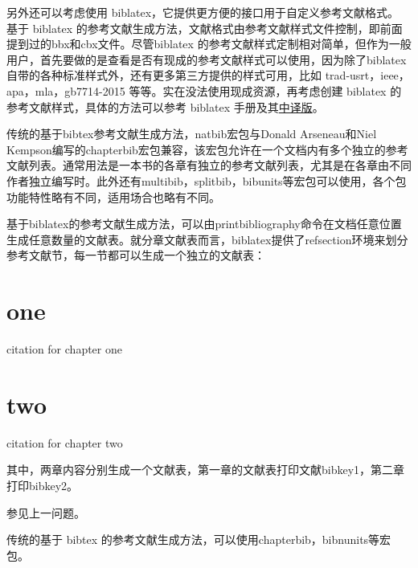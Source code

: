 另外还可以考虑使用 biblatex，它提供更方便的接口用于自定义参考文献格式。
基于 biblatex 的参考文献生成方法，文献格式由参考文献样式文件控制，即前面提到过的bbx和cbx文件。尽管biblatex 的参考文献样式定制相对简单，但作为一般用户，首先要做的是查看是否有现成的参考文献样式可以使用，因为除了biblatex自带的各种标准样式外，还有更多第三方提供的样式可用，比如 trad-usrt，ieee，apa，mla，gb7714-2015 等等。实在没法使用现成资源，再考虑创建 biblatex 的参考文献样式，具体的方法可以参考 biblatex 手册及其\href{https://github.com/hushidong/biblatex-zh-cn}{中译版}。






传统的基于bibtex参考文献生成方法，natbib宏包与Donald Arseneau和Niel Kempson编写的chapterbib宏包兼容，该宏包允许在一个文档内有多个独立的参考文献列表。通常用法是一本书的各章有独立的参考文献列表，尤其是在各章由不同作者独立编写时。此外还有multibib，splitbib，bibunits等宏包可以使用，各个包功能特性略有不同，适用场合也略有不同。

基于biblatex的参考文献生成方法，可以由printbibliography命令在文档任意位置生成任意数量的文献表。就分章文献表而言，biblatex提供了refsection环境来划分参考文献节，每一节都可以生成一个独立的文献表：

\begin{texlist}
\chapter{one}
\begin{refsection}
citation for chapter one\cite{bibkey1}
\printbibliography
\end{refsection}

\chapter{two}
\begin{refsection}
citation for chapter two\cite{bibkey2}
\printbibliography
\end{refsection}
\end{texlist}

其中，两章内容分别生成一个文献表，第一章的文献表打印文献bibkey1，第二章打印bibkey2。


参见上一问题。

传统的基于 bibtex 的参考文献生成方法，可以使用chapterbib，bibnunits等宏包。

